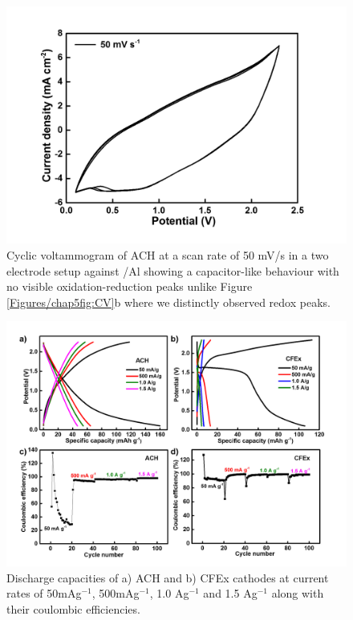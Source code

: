 \begin{figure}[th!]
\centering
\includegraphics[width=\textwidth]{Figures/chap5fig/hair50mVs}
\caption{Cyclic voltammogram of ACH at a scan rate of 50 mV/s in a two electrode setup against /Al showing a capacitor-like behaviour with no visible oxidation-reduction peaks unlike Figure \ref{Figures/chap5fig:CV}b where we distinctly observed redox peaks.}
\label{Figures/chap5fig:hair50mVs}
\end{figure}

\begin{figure}[h!]
  \centering
  \includegraphics[width=\textwidth]{Figures/chap5fig/cfexachlong.png}
    \caption{Discharge capacities of a) ACH and b) CFEx cathodes at current rates of 50mAg$^{-1}$, 500mAg$^{-1}$, 1.0 Ag$^{-1}$ and 1.5 Ag$^{-1}$ along with their coulombic efficiencies. }
  \label{Figures/chap5fig:cfexachlong}
\end{figure}

